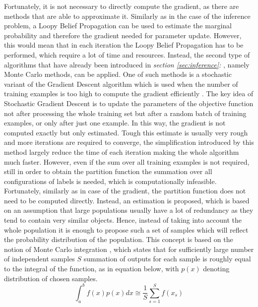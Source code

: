 Fortunately, it is not necessary to directly compute the gradient, as there are methods that are able to approximate it. Similarly as in the case of the inference problem, a Loopy Belief Propagation can be used to estimate the marginal probability and therefore the gradient needed for parameter update. However, this would mean that in each iteration the Loopy Belief Propagation has to be performed, which require a lot of time and resources. Instead, the second type of algorithms that have already been introduced in \textit{section \ref{sec:inference}: }, namely Monte Carlo methods, can be applied. One of such methods is a stochastic variant of the Gradient Descent algorithm which is used when the number of training examples is too high to compute the gradient efficiently \cite{optimisation_curtis}. The key idea of Stochastic Gradient Descent is to update the parameters of the objective function not after processing the whole training set but after a random batch of training examples, or only after just one example. In this way, the gradient is not computed exactly but only estimated. Tough this estimate is usually very rough and more iterations are required to converge, the simplification introduced by this method largely reduce the time of each iteration making the whole algorithm much faster. However, even if the sum over all training examples is not required, still in order to obtain the partition function the summation over all configurations of labels is needed, which is computationally infeasible. Fortunately, similarly as in case of the gradient, the partition function does not need to be computed directly. Instead, an estimation is proposed, which is based on an assumption that large populations usually have a lot of redundancy as they tend to contain very similar objects. Hence, instead of taking into account the whole population it is enough to propose such a set of samples which will reflect the probability distribution of the population. This concept is based on the notion of Monte Carlo integration \cite{bayesian_statistics}, which states that for sufficiently large number of independent samples $S$ summation of outputs for each sample is roughly equal to the integral of the function, as in equation below, with $p(x)$ denoting distribution of chosen samples.
\begin{equation}
    \int_{a}^{b}{f(x)p(x)dx} \cong \frac{1}{S}\sum_{s=1}^{S}{f(x_s)}
\end{equation}
